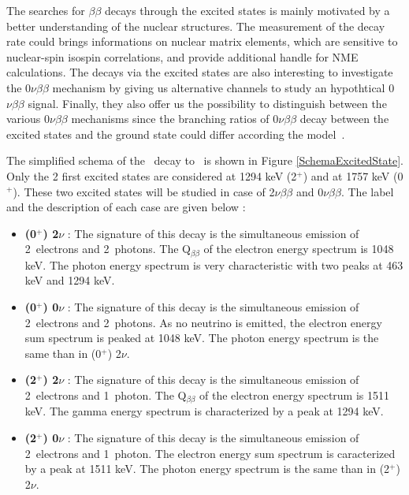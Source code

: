 \documentclass[main.tex]{subfiles}
\begin{document}
\bigskip


\NI The searches for $\beta \beta$ decays through the excited states is mainly motivated by a better understanding of the nuclear structures. The measurement of the decay rate could brings informations on nuclear matrix elements, which are sensitive to nuclear-spin isospin correlations, and provide additional handle for NME calculations. The decays via the excited states are also interesting to investigate the 0$\nu\beta\beta$ mechanism by giving us alternative channels to study an hypothtical 0$\nu\beta\beta$ signal. Finally, they also offer us the possibility to distinguish between the various 0$\nu\beta\beta$ mechanisms since the branching ratios of 0$\nu\beta\beta$ decay between the excited states and the ground state could differ according the model~\cite{TheoryOfNeutrinolessDBD}.


\bigskip


\NI The simplified schema of the \Cd~decay to \Sn~is shown in Figure \ref{SchemaExcitedState}. Only the 2 first excited states are considered at 1294 keV (2$^+$) and at 1757 keV (0$^+$). These two excited states will be studied in case of 2$\nu\beta\beta$ and 0$\nu\beta\beta$. The label and the description of each case are given below :



\begin{itemize}
\item \textbf{(0$^+$) 2$\nu$} : The signature of this decay is the simultaneous emission of 2~electrons and 2~photons. The Q$_{\beta \beta}$ of the electron energy spectrum is 1048 keV. The photon energy spectrum is very characteristic with two peaks at 463 keV and 1294 keV.

\item \textbf{(0$^+$) 0$\nu$} : The signature of this decay is the simultaneous emission of 2~electrons and 2~photons. As no neutrino is emitted, the electron energy sum spectrum is peaked at 1048 keV. The photon energy spectrum is the same than in (0$^+$) 2$\nu$.

\item \textbf{(2$^+$) 2$\nu$} : The signature of this decay is the simultaneous emission of 2~electrons and 1~photon. The Q$_{\beta \beta}$ of the electron energy spectrum is 1511 keV. The gamma energy spectrum is characterized by a peak at 1294 keV.

\item \textbf{(2$^+$) 0$\nu$} : The signature of this decay is the simultaneous emission of 2~electrons and 1~photon. The electron energy sum spectrum is caracterized by a peak at 1511 keV. The photon energy spectrum is the same than in (2$^+$) 2$\nu$.
\end{itemize}
\end{document}
